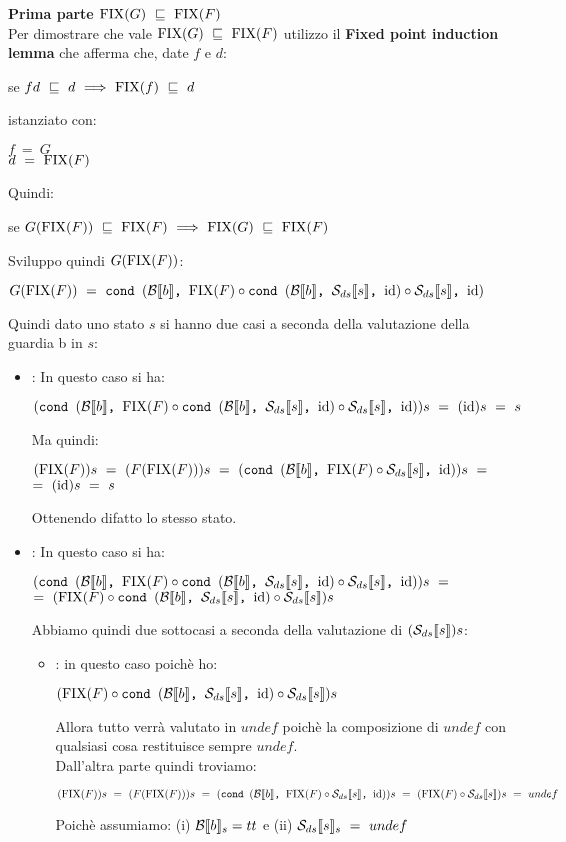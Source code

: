 {	\textbf{Prima parte $\fixp{G}~\mineq~\fixp{F}$}\\
	Per dimostrare che vale $\fixp{G}~\mineq~\fixp{F}$ utilizzo il
	\textbf{Fixed point induction lemma} che afferma che, date $f$ e $d$:
	\begin{center}
	se $fd~\mineq~d~\Longrightarrow~\fixp{f}~\mineq~d$
	\end{center}
	istanziato con:
	\begin{center}
	$f~=~G$ \\
	$d~=~\fixp{F}$
	\end{center}
	Quindi:
	\begin{center}
	se $G(\fixp{F})~\mineq~\fixp{F}~\Longrightarrow~\fixp{G}~\mineq~\fixp{F}$
	\end{center}
	Sviluppo quindi $G(\fixp{F})$:
	\begin{center}
	$G(\fixp{F})~=~\cond{b}{\fixp{F} \circ \cond{b}{\Sds{}}{\idDS} \circ{} \Sds{}}{\idDS}$
	\end{center}
	Quindi dato uno stato $s$ si hanno due casi a seconda della valutazione della guardia b in $s$:
	\begin{itemize}
		\item {}: In questo caso si ha:
		\begin{center}
		$(\cond{b}{\fixp{F} \circ \cond{b}{\Sds{}}{\idDS} \circ{} \Sds{}}{\idDS})s~=~(\idDS{})s~=~s$
		\end{center}
		Ma quindi:
		\begin{center}
		$(\fixp{F})s~=~(F(\fixp{F}))s~=~(\cond{b}{\fixp{F} \circ{} \Sds{}}{\idDS})s~=$\\$=~(\idDS{})s~=~s$
		\end{center}
		Ottenendo difatto lo stesso stato.

		\item {}: In questo caso si ha:
		\begin{center}
		$(\cond{b}{\fixp{F} \circ \cond{b}{\Sds{}}{\idDS} \circ{} \Sds{}}{\idDS})s~=$\\$=~(\fixp{F} \circ \cond{b}{\Sds{}}{\idDS} \circ{} \Sds{})s$
		\end{center}
		Abbiamo quindi due sottocasi a seconda della valutazione di $(\Sds{})s$:
		\begin{itemize}
			\item {}: in questo caso poichè ho:
			\begin{center}
			$(\fixp{F} \circ \cond{b}{\Sds{}}{\idDS} \circ{} \Sds{})s$
			\end{center}
			Allora tutto verrà valutato in $undef$ poichè la composizione di $undef$ con qualsiasi cosa restituisce sempre $undef$.\\
			Dall'altra parte quindi troviamo:
			\begin{center}
			$(\fixp{F})s~=~(F(\fixp{F}))s~=~(\cond{b}{\fixp{F} \circ{} \Sds{}}{\idDS})s~=~(\fixp{F} \circ{} \Sds{})s~=~undef$
			\end{center}
			Poichè assumiamo: (i) $\evalBbs{b}{s}=tt$ e (ii) $\Sds{}_s~=~undef$


\end{itemize}
\end{itemize}}
